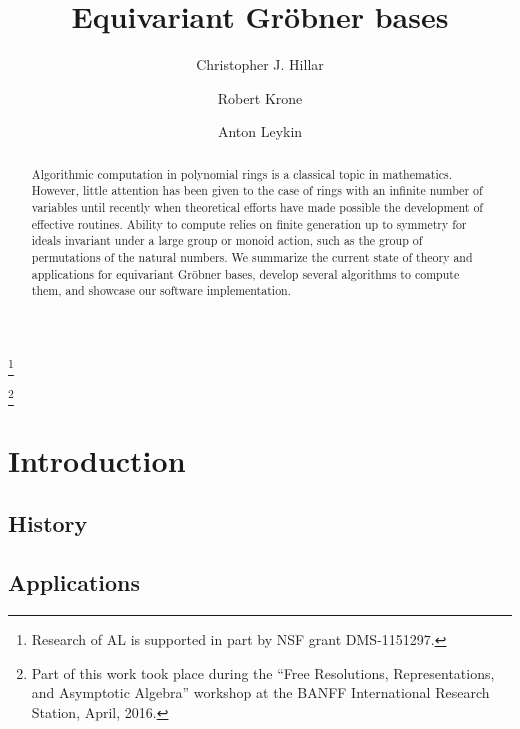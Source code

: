 \documentclass[11pt]{amsart}
\theoremstyle{definition}
\numberwithin{equation}{section}
\begin{document}
 \title{Equivariant Gr\"obner bases}

\author{Christopher J. Hillar}
\address{University of California, Berkeley}

\author{Robert Krone}
\address{Queens University}

\author{Anton Leykin}
\address{Georgia Tech}
\thanks{Research of AL is supported in part by NSF grant DMS-1151297.}

\thanks{Part of this work took place during the ``Free Resolutions, Representations, and Asymptotic Algebra'' workshop at the BANFF International Research Station, April, 2016.} 



\begin{abstract}
Algorithmic computation in polynomial rings is a classical topic in mathematics. However, little attention has been given to the case of rings with an infinite number of variables until recently when theoretical efforts have made possible the development of effective routines. Ability to compute relies on finite generation up to symmetry for ideals invariant under a large group or monoid action, such as the group of permutations of the natural numbers. We summarize the current state of theory and applications for equivariant Gr\"obner bases, develop several algorithms to compute them, and showcase our software implementation. 
\end{abstract} 

\maketitle 
\section{Introduction}
\subsection{History}



\subsection{Applications}
\end{document}
